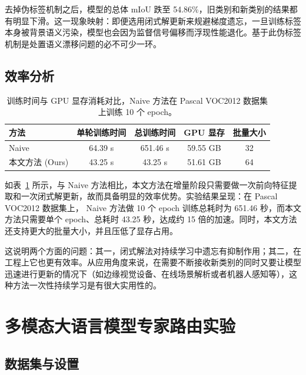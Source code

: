 去掉伪标签机制之后，模型的总体 mIoU 跌至 54.86\%，旧类别和新类别的结果都有明显下滑。这一现象映射：即便选用闭式解更新来规避梯度遗忘，一旦训练标签本身被背景语义污染，模型也会因为监督信号偏移而浮现性能退化。基于此伪标签机制是处置语义漂移问题的必不可少一环。

\subsection{效率分析}

\begin{table}[!htbp]
\caption{训练时间与 GPU 显存消耗对比，Naive 方法在 Pascal VOC2012 数据集上训练 10 个 epoch。}
\centering
\begin{tabular*}{\linewidth}{@{\extracolsep{\fill}}lcccc}
\toprule
\textbf{方法}     & \textbf{单轮训练时间} & \textbf{总训练时间} & \textbf{GPU 显存} & \textbf{批量大小} \\
\midrule
Naive              & 64.39 s                  & 651.46 s        & 59.55 GB          & 32                  \\
本文方法 (Ours) & 43.25 s                  & 43.25 s         & 51.61 GB          & 64                  \\
\bottomrule
\end{tabular*}
\label{tab:performance_comparison}
\end{table}

如表~\ref{tab:performance_comparison} 所示，与 Naive 方法相比，本文方法在增量阶段只需要做一次前向特征提取和一次闭式解更新，故而具备明显的效率优势。实验结果呈现：在 Pascal VOC2012 数据集上， Naive 方法做 10 个 epoch 训练总耗时为 651.46 秒，而本文方法只需要单个 epoch、总耗时 43.25 秒，达成约 15 倍的加速。同时，本文方法还支持更大的批量大小，并且压低了显存占用。

这说明两个方面的问题：其一，闭式解法对持续学习中遗忘有抑制作用；其二，在工程上它也更有效率。从应用角度来说，在需要不断接收新类别的同时又要让模型迅速进行更新的情况下（如边缘视觉设备、在线场景解析或者机器人感知等），这种方法一次性持续学习是有很大实用性的。

\section{多模态大语言模型专家路由实验}

\subsection{数据集与设置}

